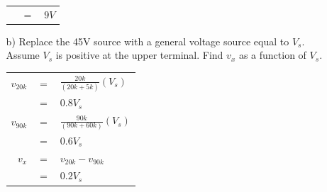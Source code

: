 \documentclass[a4paper]{article}
\begin{document}
\begin{itemize}
\begin{itemize}
\begin{tabular}{rcl}
	      	      	             & $=$ & $9 V$                       \\
	      	      \end{tabular}  
	      	\item[b)] Replace the 45V source with a general voltage source equal to $V_{s}$. Assume $V_{s}$ is positive at the upper terminal. Find $v_{x}$ as a function of $V_{s}$. \\
	      	      \begin{tabular}{rcl}
	      	      	$v_{20k}$ & $=$ & $\frac{20k}{(20k + 5k)}(V_{s})$ \\
	      	      	         & $=$ & $0.8 V_{s}$                      \\
	      	      	$v_{90k}$ & $=$ & $\frac{90k}{(90k + 60k)}(V_{s})$ \\
	      	      	         & $=$ & $0.6 V_{s}$                      \\
	      	      	$v_{x}$  & $=$ & $v_{20k} - v_{90k}$             \\
	      	      	         & $=$ & $0.2 V_{s}$                   \\
	      	      \end{tabular}  
	      \end{itemize} 
\end{itemize}
    
\end{document}
